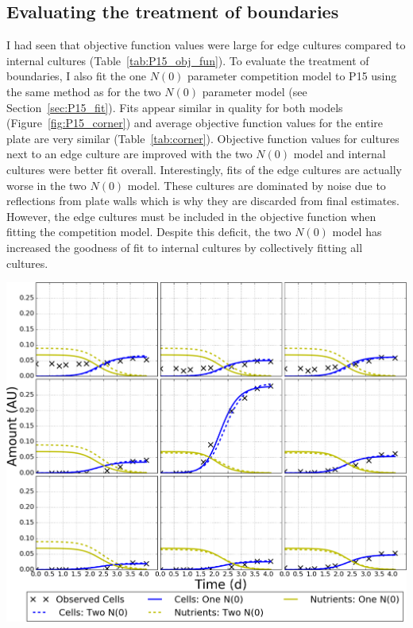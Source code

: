 \begin{multicols}{2}



\subsection{Evaluating the treatment of boundaries}
\label{sec:treatment_of_boundaries}

I had seen that objective function values were large for edge cultures
compared to internal cultures (Table~\ref{tab:P15_obj_fun}). To
evaluate the treatment of boundaries, I also fit the one \(N(0)\)
parameter competition model to P15 using the same method as for the
two \(N(0)\) parameter model (see Section~\ref{sec:P15_fit}). Fits
appear similar in quality for both models
(Figure~\ref{fig:P15_corner}) and average objective function values
for the entire plate are very similar
(Table~\ref{tab:corner}). Objective function values for cultures next
to an edge culture are improved with the two \(N(0)\) model and
internal cultures were better fit overall. Interestingly, fits of the
edge cultures are actually worse in the two \(N(0)\) model. These
cultures are dominated by noise due to reflections from plate walls
which is why they are discarded from final estimates. However, the
edge cultures must be included in the objective function when fitting
the competition model. Despite this deficit, the two \(N(0)\) model
has increased the goodness of fit to internal cultures by collectively
fitting all cultures.


\graphicspath{{images/corners/}}
\begin{Figure}
  \centering
  \includegraphics[width=\linewidth]{final/top_left_new_aspect_2}
  \label{fig:P15_corner}
\end{Figure}



\end{multicols}
